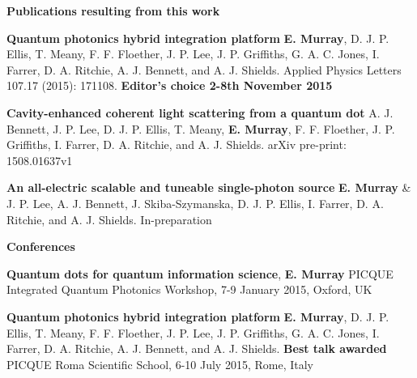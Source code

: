 \documentclass[12pt, oneside]{book}
\begin{document}
\newpage \large\textbf{Publications resulting from this work}

\small \textbf{Quantum photonics hybrid integration platform} \newline
\textbf{E. Murray}, D. J. P. Ellis, T. Meany, F. F. Floether, J. P. Lee, J. P.
Griffiths, G. A. C. Jones, I. Farrer, D. A. Ritchie, A. J. Bennett, and A. J.
Shields. \newline Applied Physics Letters 107.17 (2015): 171108. \newline \textbf{Editor's choice 2-8th November 2015}

\small \textbf{Cavity-enhanced coherent light scattering from a quantum dot} A.
J. Bennett, J. P. Lee, D. J. P. Ellis, T. Meany, \textbf{E. Murray}, F. F.
Floether, J. P. Griffiths, I. Farrer, D. A. Ritchie, and A. J. Shields. \newline
arXiv pre-print: 1508.01637v1

\small \textbf{An all-electric scalable and tuneable single-photon source}
\textbf{E. Murray} \& J. P. Lee, A. J. Bennett, J. Skiba-Szymanska, D. J. P. Ellis, I. Farrer, D. A. Ritchie, and A. J. Shields. \newline
In-preparation


\large\textbf{Conferences}

\small \textbf{Quantum dots for quantum information science}, \newline
\textbf{E. Murray} \newline PICQUE Integrated Quantum Photonics Workshop, 7-9
January 2015, Oxford, UK

\small \textbf{Quantum photonics hybrid integration platform} \newline
\textbf{E. Murray}, D. J. P. Ellis, T. Meany, F. F. Floether, J. P. Lee, J. P.
Griffiths, G. A. C. Jones, I. Farrer, D. A. Ritchie, A. J. Bennett, and A. J.
Shields. \newline \textbf{Best talk awarded} PICQUE Roma Scientific School, 6-10
July 2015, Rome, Italy

\newpage \tableofcontents


 {}
\end{document}

